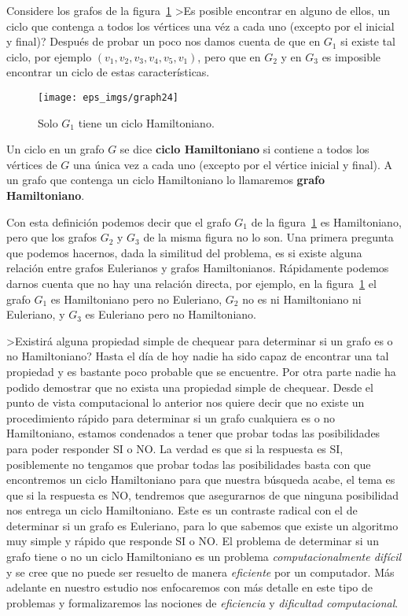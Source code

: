 Considere los grafos de la figura~\ref{fig:graph24}
>Es posible encontrar en alguno de ellos, un ciclo que contenga a todos los vértices una véz a cada uno (excepto por el inicial y final)?
Después de probar un poco nos damos cuenta de que en $G_1$ si existe tal ciclo, por ejemplo $(v_1,v_2,v_3,v_4,v_5,v_1)$, pero que en $G_2$ y en $G_3$ es imposible encontrar un ciclo de estas características.
\begin{figure}[h!]
\centering
\texttt{[image: eps\_imgs/graph24]}
\caption{Solo $G_1$ tiene un ciclo Hamiltoniano.}
\label{fig:graph24}
\end{figure}

\begin{definicion}
Un ciclo en un grafo $G$ se dice {\bf ciclo Hamiltoniano} si contiene a todos los vértices de $G$ una única vez a cada uno (excepto por el vértice inicial y final).
A un grafo que contenga un ciclo Hamiltoniano lo llamaremos {\bf grafo Hamiltoniano}.
\end{definicion}

Con esta definición podemos decir que el grafo $G_1$ de la figura~\ref{fig:graph24} es Hamiltoniano, pero que los grafos $G_2$ y $G_3$ de la misma figura no lo son.
Una primera pregunta que podemos hacernos, dada la similitud del problema, es si existe alguna relación entre grafos Eulerianos y grafos Hamiltonianos.
Rápidamente podemos darnos cuenta que no hay una relación directa, por ejemplo, en la figura~\ref{fig:graph24} el grafo $G_1$ es Hamiltoniano pero no Euleriano, $G_2$ no es ni Hamiltoniano ni Euleriano, y $G_3$ es Euleriano pero no Hamiltoniano.

>Existirá alguna propiedad simple de chequear para determinar si un grafo es o no Hamiltoniano?
Hasta el día de hoy nadie ha sido capaz de encontrar una tal propiedad y es bastante poco probable que se encuentre.
Por otra parte nadie ha podido demostrar que no exista una propiedad simple de chequear.
Desde el punto de vista computacional lo anterior nos quiere decir que no existe un procedimiento rápido para determinar si un grafo cualquiera es o no Hamiltoniano, estamos condenados a tener que probar todas las posibilidades para poder responder SI o NO.
La verdad es que si la respuesta es SI, posiblemente no tengamos que probar todas las posibilidades basta con que encontremos un ciclo Hamiltoniano para que nuestra búsqueda acabe, el tema es que si la respuesta es NO, tendremos que asegurarnos de que ninguna posibilidad nos entrega un ciclo Hamiltoniano.
Este es un contraste radical con el de determinar si un grafo es Euleriano, para lo que sabemos que existe un algoritmo muy simple y rápido que responde SI o NO.
El problema de determinar si un grafo tiene o no un ciclo Hamiltoniano es un problema \emph{computacionalmente difícil} y se cree que no puede ser resuelto de manera \emph{eficiente} por un computador.
Más adelante en nuestro estudio nos enfocaremos con más detalle en este tipo de problemas y formalizaremos las nociones de \emph{eficiencia} y \emph{dificultad computacional}.

